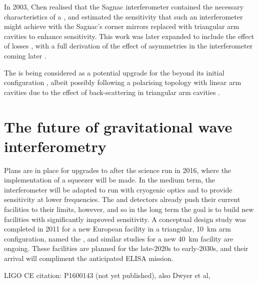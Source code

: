 In 2003, Chen realised that the Sagnac interferometer contained the necessary characteristics of a \SM{} \cite{Chen2003}, and estimated the sensitivity that such an interferometer might achieve with the Sagnac's corner mirrors replaced with triangular arm cavities to enhance sensitivity. This work was later expanded to include the effect of losses \cite{Danilishin2004}, with a full derivation of the effect of asymmetries in the interferometer coming later \cite{Danilishin2015}.

The \SSM{} is being considered as a potential upgrade for the \ET{} beyond its initial configuration \cite{Wang2013, Huttner2016}, albeit possibly following a polarising topology with linear arm cavities \cite{Danilishin2004} due to the effect of back-scattering in triangular arm cavities .

\section{The future of gravitational wave interferometry}
Plans are in place for upgrades to \ALIGO{} after the science run in 2016, where the implementation of a squeezer will be made. In the medium term, the interferometer will be adapted to run with cryogenic optics and to provide sensitivity at lower frequencies. The \ALIGO{} and \AVIRGO{} detectors already push their current facilities to their limits, however, and so in the long term the goal is to build new facilities with significantly improved sensitivity. A conceptual design study was completed in 2011 for a new European facility in a triangular, \SI{10}{\kilo\meter} arm configuration, named the \ET{}, and similar studies for a new \SI{40}{\kilo\meter} \LIGO{} facility are ongoing. These facilities are planned for the late-2020s to early-2030s, and their arrival will compliment the anticipated \gls{ELISA} mission.


LIGO CE citation: P1600143 (not yet published), also Dwyer et al, \cite{Dwyer2015}